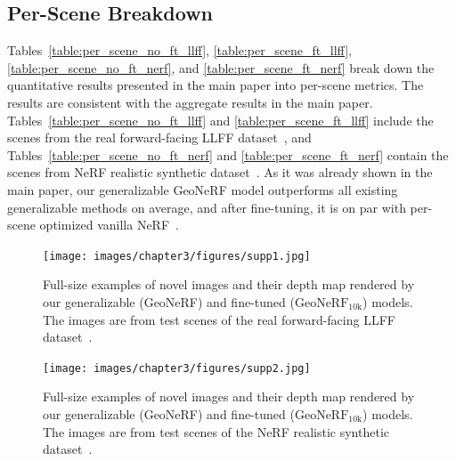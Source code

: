 \subsection{Per-Scene Breakdown}
Tables~\ref{table:per_scene_no_ft_llff}, \ref{table:per_scene_ft_llff}, \ref{table:per_scene_no_ft_nerf}, and \ref{table:per_scene_ft_nerf} break down the quantitative results presented in the main paper into per-scene metrics. The results are consistent with the aggregate results in the main paper.  Tables~\ref{table:per_scene_no_ft_llff} and \ref{table:per_scene_ft_llff} include the scenes from the real forward-facing LLFF dataset~\cite{mildenhall2019llff}, and Tables~\ref{table:per_scene_no_ft_nerf} and \ref{table:per_scene_ft_nerf} contain the scenes from NeRF realistic synthetic dataset~\cite{mildenhall2020nerf}. As it was already shown in the main paper, our generalizable GeoNeRF model outperforms all existing generalizable methods on average, and after fine-tuning, it is on par with per-scene optimized vanilla NeRF~\cite{mildenhall2020nerf}.

\begin{figure}[t]
    \begin{center}
        \texttt{[image: images/chapter3/figures/supp1.jpg]}
    \end{center}
   \caption{Full-size examples of novel images and their depth map rendered by our generalizable (GeoNeRF) and fine-tuned ($\text{GeoNeRF}_{\text{10k}}$) models. The images are from test scenes of the real forward-facing LLFF dataset~\cite{mildenhall2019llff}.}
    \label{fig:c3_supp_llff}
\end{figure}

\begin{figure}[t]
    \begin{center}
        \texttt{[image: images/chapter3/figures/supp2.jpg]}
    \end{center}
   \caption{Full-size examples of novel images and their depth map rendered by our generalizable (GeoNeRF) and fine-tuned ($\text{GeoNeRF}_{\text{10k}}$) models. The images are from test scenes of the NeRF realistic synthetic dataset~\cite{mildenhall2020nerf}.}
   \vspace{-2.5ex}
    \label{fig:c3_supp_nerf}
\end{figure}
\FloatBarrier

